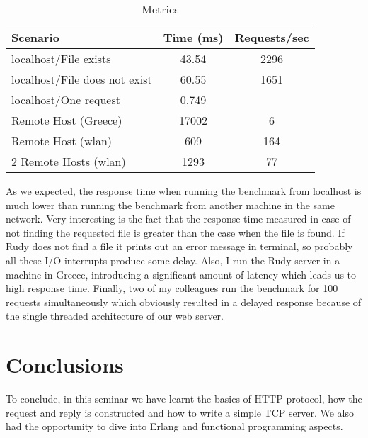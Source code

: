 \documentclass[a4paper]{article}
\begin{document}
\begin{table}
    \centering
    \begin{tabular}{| l | c | c |}
        \hline
        \textbf{Scenario}       & \textbf{Time (ms)} & \textbf{Requests/sec}\\
        \hline
        \hline
        localhost/File exists   & 43.54     & 2296\\
        \hline
        localhost/File does not exist  & 60.55 & 1651\\
        \hline
        localhost/One request  & 0.749 & \\
        \hline
        Remote Host (Greece)    & 17002 &   6\\
        \hline
        Remote Host (wlan)      & 609   &  164\\
        \hline
        2 Remote Hosts (wlan)   & 1293  &  77\\ 
        \hline
    \end{tabular}
    \caption{Metrics}
    \label{tab:metrics}
\end{table}

As we expected, the response time when running the benchmark from localhost is
much lower than running the benchmark from another machine in the same network.
Very interesting is the fact that the response time measured in case of
not finding the requested file is greater than the case when the file is found. If Rudy does not find a file
it prints out an error message in terminal, so probably all these I/O interrupts
produce some delay. Also, I run the Rudy server in a machine in Greece,
introducing a significant amount of latency which leads us to high response time.
Finally, two of my colleagues run the benchmark for 100 requests simultaneously
which obviously resulted in a delayed response because of the single threaded
architecture of our web server. 

\section{Conclusions}

To conclude, in this seminar we have learnt the basics of HTTP protocol, how the
request and reply is constructed and how to write a simple TCP server. We also
had the opportunity to dive into Erlang and functional programming aspects.
\end{document}
